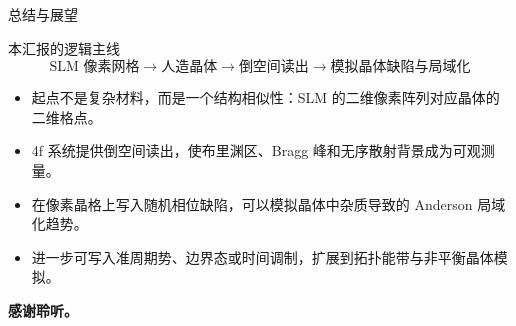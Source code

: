 \documentclass[UTF8,fontset=none,aspectratio=169,10pt]{ctexbeamer}
\begin{document}
\begin{frame}{总结与展望}
\begin{block}{本汇报的逻辑主线}
\[
\boxed{
\text{SLM 像素网格}
\rightarrow
\text{人造晶体}
\rightarrow
\text{倒空间读出}
\rightarrow
\text{模拟晶体缺陷与局域化}
}
\]
\end{block}

\begin{itemize}
  \item 起点不是复杂材料，而是一个结构相似性：SLM 的二维像素阵列对应晶体的二维格点。
  \item 4f 系统提供倒空间读出，使布里渊区、Bragg 峰和无序散射背景成为可观测量。
  \item 在像素晶格上写入随机相位缺陷，可以模拟晶体中杂质导致的 Anderson 局域化趋势。
  \item 进一步可写入准周期势、边界态或时间调制，扩展到拓扑能带与非平衡晶体模拟。
\end{itemize}

\vfill
\begin{center}
{\Large\bfseries 感谢聆听。}
\end{center}
\end{frame}
\end{document}
